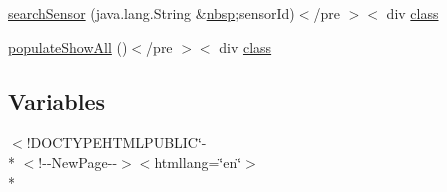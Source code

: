 \begin{DoxyCompactItemize}
\item 
\hyperlink{_show_all_activity_8html_afc25a55ebc29682277bb9f4d28b5be92}{search\-Sensor} (java.\-lang.\-String \&\hyperlink{_tools_8html_aef915316f784c9063d942974538301a6}{nbsp};sensor\-Id)$<$/pre $>$$<$ div \hyperlink{_tools_8html_acf06f836132665ba8114f5a414c2403f}{class}
\item 
\hyperlink{_show_all_activity_8html_a6ce8d1566539dd252daee6b4337e6b83}{populate\-Show\-All} ()$<$/pre $>$$<$ div \hyperlink{_tools_8html_acf06f836132665ba8114f5a414c2403f}{class}
\end{DoxyCompactItemize}
\subsection*{Variables}
\begin{DoxyCompactItemize}
\item 
$<$!D\-O\-C\-T\-Y\-P\-E\-H\-T\-M\-L\-P\-U\-B\-L\-I\-C\char`\"{}-\/\\*
$<$!-\/-\/New\-Page-\/-\/$>$$<$htmllang=\char`\"{}en\char`\"{}$>$\\*
$$
\end{DoxyCompactItemize}
